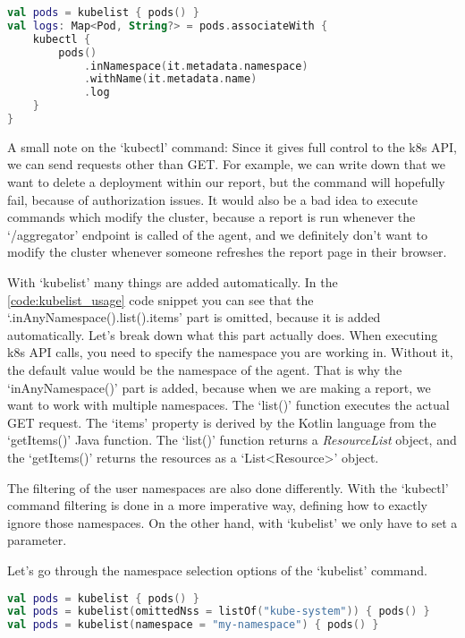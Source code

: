 \begin{lstlisting}[caption={Download pod logs},language=Kotlin,label=code:get_logs]
val pods = kubelist { pods() }
val logs: Map<Pod, String?> = pods.associateWith {
    kubectl {
        pods()
            .inNamespace(it.metadata.namespace)
            .withName(it.metadata.name)
            .log
    }
}
\end{lstlisting}

A small note on the `kubectl' command: Since it gives full control to the k8s API, we can send requests other than GET. For example, we can write down that we want to delete a deployment within our report, but the command will hopefully fail, because of authorization issues. It would also be a bad idea to execute commands which modify the cluster, because a report is run whenever the `/aggregator' endpoint is called of the agent, and we definitely don't want to modify the cluster whenever someone refreshes the report page in their browser.

With `kubelist' many things are added automatically. In the \ref{code:kubelist_usage} code snippet you can see that the `.inAnyNamespace().list().items' part is omitted, because it is added automatically. Let's break down what this part actually does. When executing k8s API calls, you need to specify the namespace you are working in. Without it, the default value would be the namespace of the agent. That is why the `inAnyNamespace()' part is added, because when we are making a report, we want to work with multiple namespaces. The `list()' function executes the actual GET request. The `items' property is derived by the Kotlin language from the `getItems()' Java function. The `list()' function returns a \emph{ResourceList} object, and the `getItems()' returns the resources as a `List<Resource>' object.

The filtering of the user namespaces are also done differently. With the `kubectl' command filtering is done in a more imperative way, defining how to exactly ignore those namespaces. On the other hand, with `kubelist' we only have to set a parameter.

Let's go through the namespace selection options of the `kubelist' command.

\begin{lstlisting}[caption={Usages of kubelist},language=Kotlin,label=code:kubelist]
val pods = kubelist { pods() }
val pods = kubelist(omittedNss = listOf("kube-system")) { pods() }
val pods = kubelist(namespace = "my-namespace") { pods() }
\end{lstlisting}

